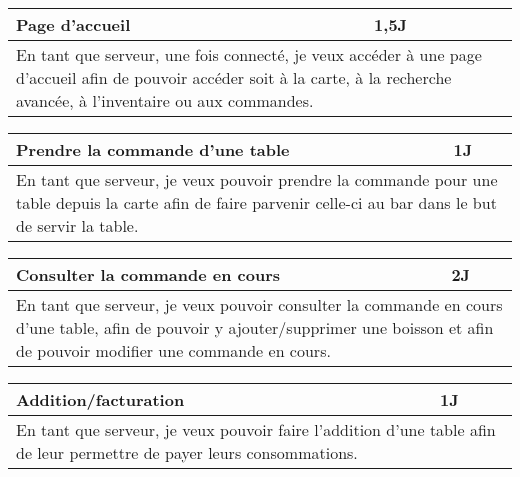 \begin{center}
	\begin{tabular}{ll}
		\hline
			\multicolumn{1}{|p{14cm}|}{Page d'accueil} & \multicolumn{1}{p{0.7cm}|}{1,5J} \\ 
		\hline
			\multicolumn{2}{|p{15cm}|}{En tant que serveur, une fois connecté, je veux 
			accéder à une page d'accueil afin de pouvoir accéder soit à la carte, à la 
			recherche avancée, à l'inventaire ou aux commandes.} \\
		\hline
	\end{tabular}

	\vspace{1cm}
	
	\begin{tabular}{ll}
		\hline
			\multicolumn{1}{|p{14cm}|}{Prendre la commande d'une table} & \multicolumn{1}{p{0.7cm}|}{1J} \\ 
		\hline
			\multicolumn{2}{|p{15cm}|}{En tant que serveur, je veux pouvoir prendre la commande
			pour une table depuis la carte afin de faire parvenir celle-ci au bar dans le but 
			de servir la table.} \\
		\hline
	\end{tabular}

	\vspace{1cm}
	
	\begin{tabular}{ll}
		\hline
			\multicolumn{1}{|p{14cm}|}{Consulter la commande en cours} & \multicolumn{1}{p{0.7cm}|}{2J} \\ 
		\hline
			\multicolumn{2}{|p{15cm}|}{En tant que serveur, je veux pouvoir consulter
			la commande en cours d'une table, afin de pouvoir y ajouter/supprimer une
			boisson et afin de pouvoir modifier une commande en cours.} \\
		\hline
	\end{tabular}

	\vspace{1cm}
	
	\begin{tabular}{ll}
		\hline
			\multicolumn{1}{|p{14cm}|}{Addition/facturation} & \multicolumn{1}{p{0.7cm}|}{1J} \\ 
		\hline
			\multicolumn{2}{|p{15cm}|}{En tant que serveur, je veux pouvoir faire l'addition 
			d'une table afin de leur permettre de payer leurs consommations.} \\
		\hline
	\end{tabular}


\end{center}
